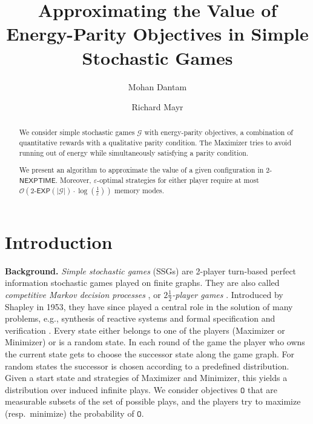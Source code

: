 \documentclass[a4paper,UKenglish,cleveref,autoref,thm-restate]{lipics-v2021}
\title{Approximating the Value of Energy-Parity Objectives in Simple Stochastic Games}
\author{Mohan Dantam}{School of Informatics, University of Edinburgh, UK}{}{}{}
\author{Richard Mayr}{School of Informatics, University of Edinburgh, UK}{}{}{}
\newcommand{\+}[1]{\mathbb{#1}}
\newcommand{\?}[1]{\mathcal{#1}}
\newcommand{\Ocompl}{\?{O}}
\newcommand{\abs}[1]{\lvert#1\rvert}
\newcommand{\size}[1]{\abs{#1}}
\newcommand{\eps}{\varepsilon}
\newcommand{\NEXPTIME}{\ensuremath{\mathsf{NEXPTIME}}}
\newcommand{\obj}{\mathtt{O}}
\newcommand{\lrc}[1]{\left(#1\right)}
\newcommand{\game}{{\mathcal G}}
\begin{document}
\maketitle

\begin{abstract}
We consider simple stochastic games $\game$ with energy-parity objectives,
a combination of quantitative rewards with a qualitative parity condition.
The Maximizer tries to avoid running out of energy while simultaneously
satisfying a parity condition.
  
We present an algorithm to approximate the value of a given configuration
in 2-\NEXPTIME. Moreover, $\eps$-optimal strategies for either player
require at most ${\Ocompl}\lrc{2\textrm{-}\mathsf{EXP}\lrc{\size{\game}} \cdot\log\lrc{\frac{1}{\eps}}}$
memory modes.
\end{abstract}


\section{Introduction}\label{sec:intro}

{\bf Background.}
\emph{Simple stochastic games} (SSGs)
are 2-player turn-based perfect information stochastic games played on finite graphs.
They are also called \emph{competitive Markov decision processes} \cite{Filar_Vrieze:book},
or \emph{$2\frac{1}{2}$-player games} \cite{CJH2004,CJH2003}.
Introduced by Shapley \cite{shapley1953stochastic} in 1953, they
have since played a central role in the solution of many problems, e.g.,
synthesis of reactive systems
\cite{ramadge1987supervisory,pnueli1989synthesis}
and formal specification and verification
\cite{de2001interface,dill1989trace,alur2002alternating}.
Every state either belongs to one of the players (Maximizer or Minimizer)
or is a random state. In each round of the game the player who owns the current
state gets to choose the successor state along the game graph.
For random states the successor is chosen according to a predefined distribution.
Given a start state and strategies of Maximizer and Minimizer, this yields a
distribution over induced infinite plays.
We consider objectives $\obj$ that are measurable subsets of the set of possible plays, and the players
try to maximize (resp.\ minimize) the probability of $\obj$.
\end{document}
